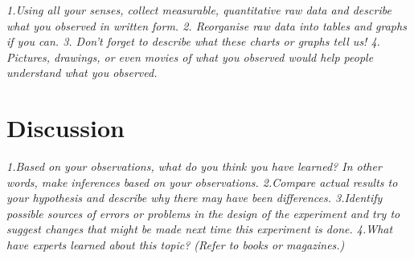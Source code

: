 \textit{1.Using all your senses, collect measurable, quantitative raw data and describe what you observed in written form.
2. Reorganise raw data into tables and graphs if you can.
3. Don't forget to describe what these charts or graphs tell us!
4. Pictures, drawings, or even movies of what you observed would help people understand what you observed.}

\section{Discussion}
\label{sec:fieldstudydiscussion}

\textit{1.Based on your observations, what do you think you have learned? In other words, make inferences based on your observations.
2.Compare actual results to your hypothesis and describe why there may have been differences.
3.Identify possible sources of errors or problems in the design of the experiment and try to suggest changes that might be made next time this experiment is done.
4.What have experts learned about this topic? (Refer to books or magazines.)}







